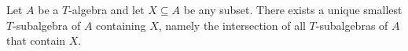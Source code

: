 Let $A$ be a $T$-algebra and let $X \subseteq A$ be any subset. There exists a unique smallest $T$-subalgebra of $A$ containing $X$, namely the intersection of all $T$-subalgebras of $A$ that contain $X$.
